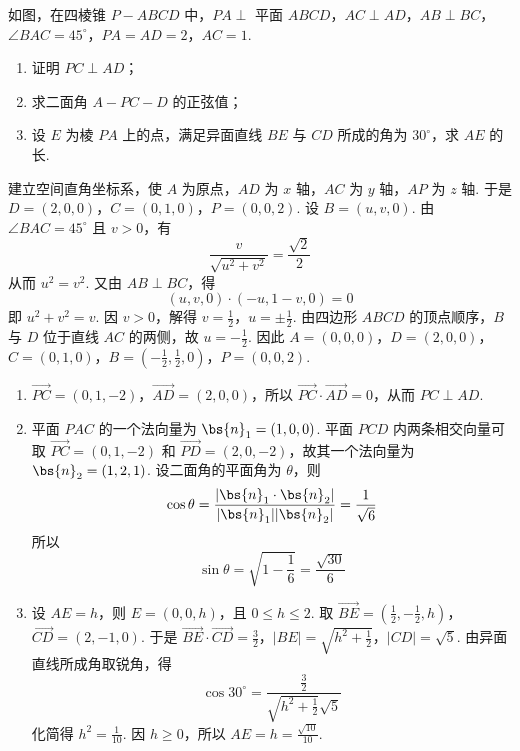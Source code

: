 \begin{problem}
如图，在四棱锥 \(P - ABCD\) 中，\(PA \perp\) 平面 \(ABCD\)，\(AC \perp AD\)，\(AB \perp BC\)，\(\angle BAC = 45^{\circ}\)，\(PA = AD = 2\)，\(AC = 1\).

\begin{enumerate}
\item 证明 \(PC \perp AD\)；
\item 求二面角 \(A - PC - D\) 的正弦值；
\item 设 \(E\) 为棱 \(PA\) 上的点，满足异面直线 \(BE\) 与 \(CD\) 所成的角为 \(30^{\circ}\)，求 \(AE\) 的长.
\end{enumerate}

\end{problem}

\begin{solution}
建立空间直角坐标系，使 \(A\) 为原点，\(AD\) 为 \(x\) 轴，\(AC\) 为 \(y\) 轴，\(AP\) 为 \(z\) 轴. 于是 \(D=(2,0,0)\)，\(C=(0,1,0)\)，\(P=(0,0,2)\). 设 \(B=(u,v,0)\). 由 \(\angle BAC=45^{\circ}\) 且 \(v>0\)，有
\[
\frac{v}{\sqrt{u^2+v^2}}=\frac{\sqrt2}{2}
\]
从而 \(u^2=v^2\). 又由 \(AB\perp BC\)，得
\[
(u,v,0)\cdot(-u,1-v,0)=0
\]
即 \(u^2+v^2=v\). 因 \(v>0\)，解得 \(v=\frac12\)，\(u=\pm\frac12\). 由四边形 \(ABCD\) 的顶点顺序，\(B\) 与 \(D\) 位于直线 \(AC\) 的两侧，故 \(u=-\frac12\). 因此 \(A=(0,0,0)\)，\(D=(2,0,0)\)，\(C=(0,1,0)\)，\(B=\left(-\frac12,\frac12,0\right)\)，\(P=(0,0,2)\).
\begin{enumerate}
\item \(\overrightarrow{PC}=(0,1,-2)\)，\(\overrightarrow{AD}=(2,0,0)\)，所以 \(\overrightarrow{PC}\cdot\overrightarrow{AD}=0\)，从而 \(PC\perp AD\).
\item 平面 \(PAC\) 的一个法向量为 \(\bs{n}_1=(1,0,0)\). 平面 \(PCD\) 内两条相交向量可取 \(\overrightarrow{PC}=(0,1,-2)\) 和 \(\overrightarrow{PD}=(2,0,-2)\)，故其一个法向量为 \(\bs{n}_2=(1,2,1)\). 设二面角的平面角为 \(\theta\)，则
\[
\cos\theta=\frac{|\bs{n}_1\cdot\bs{n}_2|}{|\bs{n}_1||\bs{n}_2|}=\frac1{\sqrt6}
\]
所以
\[
\sin\theta=\sqrt{1-\frac16}=\frac{\sqrt{30}}6
\]
\item 设 \(AE=h\)，则 \(E=(0,0,h)\)，且 \(0\leqslant h\leqslant2\). 取 \(\overrightarrow{BE}=\left(\frac12,-\frac12,h\right)\)，\(\overrightarrow{CD}=(2,-1,0)\).
于是
\(\overrightarrow{BE}\cdot\overrightarrow{CD}=\frac32\)，\(|BE|=\sqrt{h^2+\frac12}\)，\(|CD|=\sqrt5\).
由异面直线所成角取锐角，得
\[
\cos30^{\circ}=\frac{\frac{3}{2}}{\sqrt{h^2+\frac{1}{2}}\sqrt5}
\]
化简得 \(h^2=\frac1{10}\). 因 \(h\geqslant0\)，所以 \(AE=h=\frac{\sqrt{10}}{10}\).
\end{enumerate}
\end{solution}

